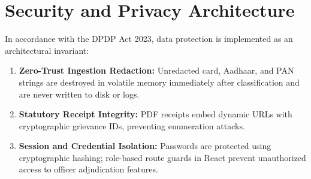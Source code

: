 \section{Security and Privacy Architecture}
In accordance with the DPDP Act 2023, data protection is implemented as an architectural invariant:
\begin{enumerate}
    \item \textbf{Zero-Trust Ingestion Redaction:} Unredacted card, Aadhaar, and PAN strings are destroyed in volatile memory immediately after classification and are never written to disk or logs.
    \item \textbf{Statutory Receipt Integrity:} PDF receipts embed dynamic URLs with cryptographic grievance IDs, preventing enumeration attacks.
    \item \textbf{Session and Credential Isolation:} Passwords are protected using cryptographic hashing; role-based route guards in React prevent unauthorized access to officer adjudication features.
\end{enumerate}
